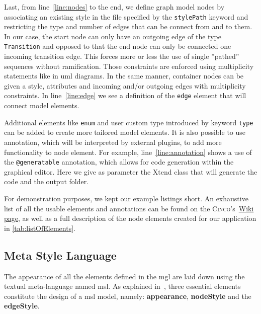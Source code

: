 Last, from line~\ref{line:nodes} to the end, we define graph model nodes by associating an existing style in the file specified by the \lstinline[language=MGL]{stylePath} keyword and restricting the type and number of edges that can be connect from and to them. In our case, the start node can only have an outgoing edge of the type \lstinline[language=MGL]{Transition} and opposed to that the end node can only be connected one incoming transition edge. This forces more or less the use of single ''pathed'' sequences without ramification. Those constraints are enforced using multiplicity statements like in \acrfull{uml} diagrams. In the same manner, container nodes can be given a style, attributes and incoming and/or outgoing edges with multiplicity constraints. In line~\ref{line:edge} we see a definition of the \lstinline[language=MGL]{edge} element that will connect model elements.

Additional elements like \lstinline[language=MGL]{enum} and user custom type introduced by keyword \lstinline[language=MGL]{type} can be added to create more tailored model elements. It is also possible to use annotation, which will be interpreted by external plugins, to add more functionality to node element. For example, line~\ref{line:annotation} shows a use of the \lstinline[language=MGL]{@generatable} annotation, which allows for code generation within the graphical editor. Here we give as parameter the Xtend class that will generate the code and the output folder.

For demonstration purposes, we kept our example listings short. An exhaustive list of all the usable elements and annotations can be found on the \textsc{Cinco}'s~\href{https://gitlab.com/scce/cinco/-/wikis/Cinco-Product-Specification}{Wiki page}, as well as a full description of the node elements created for our application in \ref{tab:listOfElements}.

\subsection{Meta Style Language}\label{sec:MSL}
The appearance of all the elements defined in the \acrshort{mgl} are laid down using the textual meta-language named \acrfull{msl}. As explained in~\cite{gitlabcinco}, three essential elements constitute the design of a \acrshort{msl} model, namely: \textbf{appearance}, \textbf{nodeStyle} and the \textbf{edgeStyle}.

